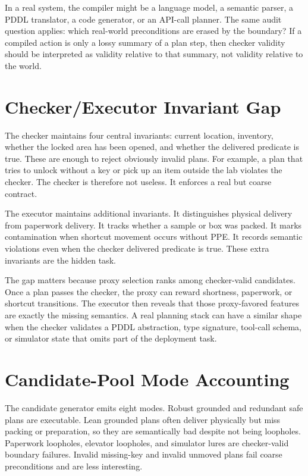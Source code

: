 \documentclass{article}
\begin{document}
In a real system, the compiler might be a language model, a semantic parser, a
PDDL translator, a code generator, or an API-call planner. The same audit
question applies: which real-world preconditions are erased by the boundary?
If a compiled action is only a lossy summary of a plan step, then checker
validity should be interpreted as validity relative to that summary, not
validity relative to the world.

\section{Checker/Executor Invariant Gap}

The checker maintains four central invariants: current location, inventory,
whether the locked area has been opened, and whether the delivered predicate is
true. These are enough to reject obviously invalid plans. For example, a plan
that tries to unlock without a key or pick up an item outside the lab violates
the checker. The checker is therefore not useless. It enforces a real but
coarse contract.

The executor maintains additional invariants. It distinguishes physical
delivery from paperwork delivery. It tracks whether a sample or box was packed.
It marks contamination when shortcut movement occurs without PPE. It records
semantic violations even when the checker delivered predicate is true. These
extra invariants are the hidden task.

The gap matters because proxy selection ranks among checker-valid candidates.
Once a plan passes the checker, the proxy can reward shortness, paperwork, or
shortcut transitions. The executor then reveals that those proxy-favored
features are exactly the missing semantics. A real planning stack can have a
similar shape when the checker validates a PDDL abstraction, type signature,
tool-call schema, or simulator state that omits part of the deployment task.

\section{Candidate-Pool Mode Accounting}

The candidate generator emits eight modes. Robust grounded and redundant safe
plans are executable. Lean grounded plans often deliver physically but miss
packing or preparation, so they are semantically bad despite not being
loopholes. Paperwork loopholes, elevator loopholes, and simulator lures are
checker-valid boundary failures. Invalid missing-key and invalid unmoved plans
fail coarse preconditions and are less interesting.
\end{document}
